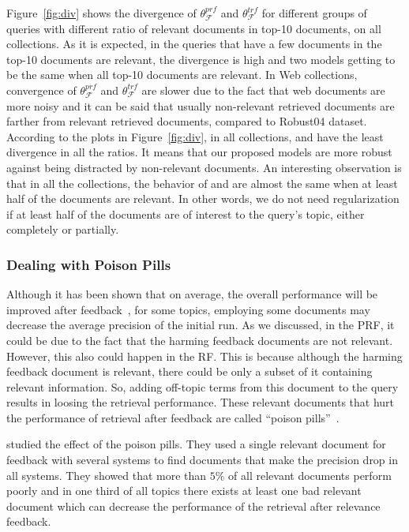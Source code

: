 Figure~\ref{fig:div} shows the divergence of $\theta_{\mathcal{F}}^{prf}$ and  $\theta_{\mathcal{F}}^{trf}$ for different groups of queries with different ratio of relevant documents in top-10 documents, on all collections. As it is expected, in the queries that have a few documents in the top-10 documents are relevant, the divergence is high and two models getting to be the same when all top-10 documents are relevant. 
In Web collections, convergence of $\theta_{\mathcal{F}}^{prf}$ and  $\theta_{\mathcal{F}}^{trf}$ are slower due to the fact that web documents are more noisy and it can be said that usually non-relevant retrieved documents are farther from relevant retrieved documents, compared to Robust04 dataset. 
According to the plots in Figure~\ref{fig:div}, in all collections, \acswlm  and \acrswlm  have the least divergence in all the ratios. It means that our proposed models are more robust against being distracted by non-relevant documents. 
An interesting observation is that in all the collections, the behavior of \acswlm  and \acrswlm  are almost the same when at least half of the documents are relevant. In other words, we do not need regularization if at least half of the documents are of interest to the query's topic, either completely or partially.


\subsubsection{Dealing with Poison Pills}
\label{sec:pp}
Although it has been shown that on average, the overall performance will be improved after feedback~\citep{Harman:2009,He:2009:ECIR}, for some topics, employing some documents may decrease the average precision of the initial run. 
As we discussed, in the PRF, it could be due to the fact that the harming feedback documents are not relevant. However, this also could happen in the RF. This is because although the harming feedback document is relevant, there could be only a subset of it containing relevant information. So, adding off-topic terms from this document to the query results in loosing the retrieval performance. These relevant documents that hurt the performance of retrieval after feedback are called ``poison pills''~\citep{Harman:2009,Warren:2004,Terra:2005,Dehghani:CIKM2016:short}.

\citet{Terra:2005} studied the effect of the poison pills. They used a single relevant document for feedback with several systems to find documents that make the precision drop in all systems. They showed that more than $5\%$ of all relevant documents perform poorly and in one third of all topics there exists at least one bad relevant document which can decrease the performance of the retrieval after relevance feedback.

